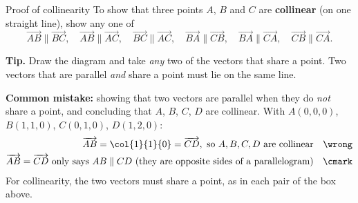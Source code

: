 \begin{definition}{Proof of collinearity}
To show that three points $A$, $B$ and $C$ are \textbf{collinear} (on one straight line), show any one of
\[
\overrightarrow{AB}\parallel\overrightarrow{BC}, \quad
\overrightarrow{AB}\parallel\overrightarrow{AC}, \quad
\overrightarrow{BC}\parallel\overrightarrow{AC}, \quad
\overrightarrow{BA}\parallel\overrightarrow{CB}, \quad
\overrightarrow{BA}\parallel\overrightarrow{CA}, \quad
\overrightarrow{CB}\parallel\overrightarrow{CA}.
\]
\end{definition}
\textbf{Tip.} Draw the diagram and take \emph{any} two of the vectors that share a point. Two vectors that are parallel \emph{and} share a point must lie on the same line.

\begin{center}
\end{center}

\begin{mistake}
\textbf{Common mistake:} showing that two vectors are parallel when they do \emph{not} share a point, and concluding that $A$, $B$, $C$, $D$ are collinear. With $A(0,0,0)$, $B(1,1,0)$, $C(0,1,0)$, $D(1,2,0)$:
\begin{align*}
\overrightarrow{AB} = \col{1}{1}{0} = \overrightarrow{CD},\ \text{so } A, B, C, D \text{ are collinear} & & \wrong \\
\overrightarrow{AB} = \overrightarrow{CD}\text{ only says }AB\parallel CD\text{ (they are opposite sides of a parallelogram)} & & \cmark
\end{align*}
For collinearity, the two vectors must share a point, as in each pair of the box above.
\end{mistake}

